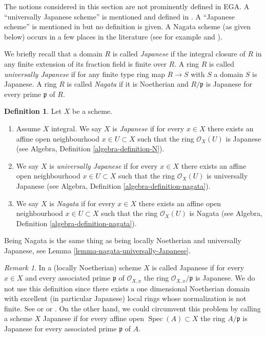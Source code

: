 \documentclass{stacks-project}
\theoremstyle{plain}
\theoremstyle{definition}
\newtheorem{definition}[subsection]{Definition}
\theoremstyle{remark}
\newtheorem{remark}[subsection]{Remark}
\numberwithin{equation}{subsection}
\def\Spec{\mathop{\mathrm{Spec}}}
\begin{document}
\noindent
The notions considered in this section are not prominently defined in EGA.
A ``universally Japanese scheme'' is mentioned and defined in
\cite[IV Corollary 5.11.4]{EGA}. A ``Japanese scheme'' is mentioned in
\cite[IV Remark 10.4.14 (ii)]{EGA} but no definition is given.
A Nagata scheme (as given below) occurs in a few
places in the literature (see for example \cite[Definition 8.2.30]{Liu} and
\cite[Page 142]{Greco}).

\medskip\noindent
We briefly recall that a domain $R$ is called {\it Japanese} if the integral
closure of $R$ in any finite extension of its fraction field is finite over
$R$. A ring $R$ is called {\it universally Japanese} if for any finite type
ring map $R \to S$ with $S$ a domain $S$ is Japanese. A ring $R$ is called
{\it Nagata} if it is Noetherian and $R/\mathfrak p$ is Japanese for every
prime $\mathfrak p$ of $R$.

\begin{definition}
\label{definition-nagata}
Let $X$ be a scheme.
\begin{enumerate}
\item Assume $X$ integral. We say $X$ is {\it Japanese}
if for every $x \in X$ there exists an
affine open neighbourhood $x \in U \subset X$ such that the ring
$\mathcal{O}_X(U)$ is Japanese (see
Algebra, Definition \ref{algebra-definition-N}).
\item We say $X$ is {\it universally Japanese} if for every $x \in X$
there exists an affine open neighbourhood $x \in U \subset X$ such that
the ring $\mathcal{O}_X(U)$ is universally Japanese (see
Algebra, Definition \ref{algebra-definition-nagata}).
\item We say $X$ is {\it Nagata} if for every $x \in X$ there exists an
affine open neighbourhood $x \in U \subset X$ such that the ring
$\mathcal{O}_X(U)$ is Nagata (see
Algebra, Definition \ref{algebra-definition-nagata}).
\end{enumerate}
\end{definition}

\noindent
Being Nagata is the same thing as being locally Noetherian
and universally Japanese, see
Lemma \ref{lemma-nagata-universally-Japanese}.

\begin{remark}
\label{remark-non-integral-Japanese}
In \cite{Hoobler-finite} a (locally Noetherian) scheme $X$ is called
Japanese if for every $x \in X$ and every associated prime $\mathfrak p$
of $\mathcal{O}_{X, x}$ the ring $\mathcal{O}_{X, x}/\mathfrak p$ is
Japanese. We do not use this definition since there exists a one
dimensional Noetherian domain with excellent (in particular
Japanese) local rings whose normalization is not finite. See
\cite[Example 1]{Hochster-loci} or \cite{Heinzer-Levy} or
\cite[Expos\'e XIX]{Traveaux}.
On the other hand, we could circumvent this problem by calling a scheme
$X$ Japanese if for every affine open $\Spec(A) \subset X$ the ring
$A/\mathfrak p$ is Japanese for every associated prime $\mathfrak p$ of $A$.
\end{remark}
\end{document}
